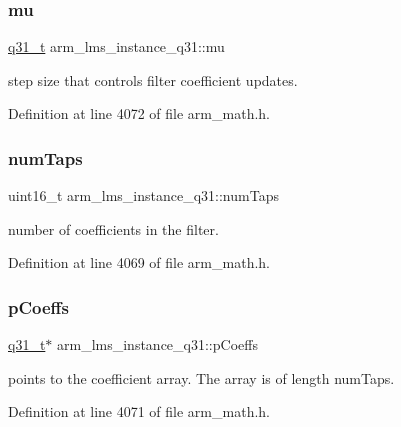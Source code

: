 \subsubsection{\texorpdfstring{mu}{mu}}
{\footnotesize\ttfamily \hyperlink{arm__math_8h_adc89a3547f5324b7b3b95adec3806bc0}{q31\+\_\+t} arm\+\_\+lms\+\_\+instance\+\_\+q31\+::mu}

step size that controls filter coefficient updates. 

Definition at line 4072 of file arm\+\_\+math.\+h.

\mbox{\label{structarm__lms__instance__q31_ac0d84f7d054555931ef8a62511fbcb8a}} 
\subsubsection{\texorpdfstring{num\+Taps}{numTaps}}
{\footnotesize\ttfamily uint16\+\_\+t arm\+\_\+lms\+\_\+instance\+\_\+q31\+::num\+Taps}

number of coefficients in the filter. 

Definition at line 4069 of file arm\+\_\+math.\+h.

\mbox{\label{structarm__lms__instance__q31_a4afe56e991a5416adfd462aa88bda500}} 
\subsubsection{\texorpdfstring{p\+Coeffs}{pCoeffs}}
{\footnotesize\ttfamily \hyperlink{arm__math_8h_adc89a3547f5324b7b3b95adec3806bc0}{q31\+\_\+t}$\ast$ arm\+\_\+lms\+\_\+instance\+\_\+q31\+::p\+Coeffs}

points to the coefficient array. The array is of length num\+Taps. 

Definition at line 4071 of file arm\+\_\+math.\+h.

\mbox{\label{structarm__lms__instance__q31_a4705a8f0011bb9166e09bf5bd51e595e}} 
